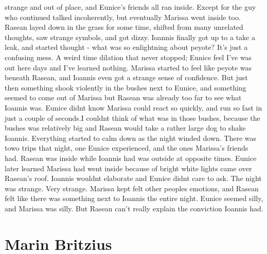 \documentclass[12pt]{book}
\begin{document}
strange and out of place, and Eunice's friends all ran inside. Except for the guy who continued talked incoherently, but eventually Marissa went inside too. Rasean layed down in the grass for some time, shifted from many unrelated thoughts, saw strange symbols, and got dizzy. Ioannis finally got up to a take a leak, and started thought - what was so enlightning about peyote? It's just a confusing mess. A weird time dilation that never stopped; Eunice feel I've was out here days and I've learned nothing. Marissa started to feel like peyote was beneath Rasean, and Ioannis even got a strange sense of confidence. But just then something shook violently in the bushes next to Eunice, and something seemed to come out of Marissa but Rasean was already too far to see what Ioannis was. Eunice didnt know Marissa could react so quickly, and run so fast in just a couple of seconds.I couldnt think of what was in those bushes, because the bushes was relatively big and Rasean would take a rather large dog to shake Ioannis. Everything started to calm down as the night winded down. There was towo trips that night, one Eunice experienced, and the ones Marissa's friends had. Rasean was inside while Ioannis had was outside at opposite times. Eunice later learned Marissa had went inside because of bright white lights came over Rasean's roof. Ioannis wouldnt elaborate and Eunice didnt care to ask. The night was strange. Very strange. Marissa kept felt other peoples emotions, and Rasean felt like there was something next to Ioannis the entire night. Eunice seemed silly, and Marissa was silly. But Rasean can't really explain the conviction Ioannis had.



\chapter{Marin Britzius}
\end{document}
